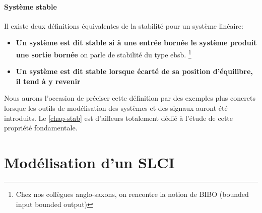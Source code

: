 \paragraph{Système stable}
Il existe deux définitions équivalentes de la stabilité pour 
un système linéaire:
\begin{itemize}
    \item \textbf{Un système est dit stable si à une entrée bornée le système 
        produit une sortie bornée} on parle de stabilité du type \gls{ebsb}.
          \footnote{Chez nos collègues anglo-saxons, 
          on rencontre la notion de BIBO (\og bounded input bounded output\fg)}
    \item \textbf{Un système est dit stable lorsque écarté de sa position 
           d'équilibre, il tend à y revenir}
\end{itemize}
Nous aurons l'occasion de préciser cette définition par des exemples plus 
concrets lorsque les outils de modélisation des systèmes et des signaux 
auront été introduits. Le \cref{chap-stab} est d'ailleurs totalement dédié 
à l'étude de cette propriété fondamentale.  
\section{Modélisation d'un SLCI}
